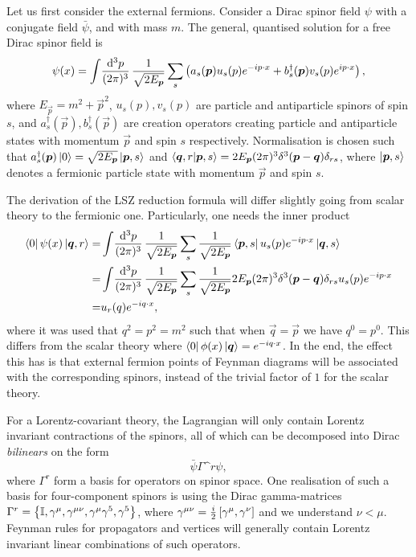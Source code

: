 \documentclass[../main.tex]{subfiles}
\begin{document}
Let us first consider the external fermions.
Consider a Dirac spinor field \(\psi\) with a conjugate field \(\bar\psi\), and with mass \(m\). The general, quantised solution for a free Dirac spinor field is~\cite{Peskin}
\begin{equation}
  \psi(x) = \loopintegral[3]{p} \frac{1}{\sqrt{2E_{\vec{p}}}} \sum_s \pclosed{a_s(\vec{p}) u_s(p) \exp{-i p\cdot x} + b_s^\dagger(\vec{p}) v_s(p) \exp{i p\cdot x}},
\end{equation}
where \(E_{\vec{p}} = m^2 + \vec{p}^2\), \(u_s(p), v_s(p)\) are particle and antiparticle spinors of spin \(s\), and \(a_s^\dagger(\vec{p}), b_s^\dagger(\vec{p})\) are creation operators creating particle and antiparticle states with momentum \(\vec{p}\) and spin \(s\) respectively.
Normalisation is chosen such that \(a_s^\dagger(\vec{p}) \ket{0} = \sqrt{2E_{\vec{p}}} \ket{\vec{p}, s}\) and \(\braket{\vec{q}, r}{\vec{p}, s} = 2E_{\vec{p}} (2\pi)^3 \delta^3(\vec{p}-\vec{q}) \delta_{rs}\), where \(\ket{\vec{p}, s}\) denotes a fermionic particle state with momentum \(\vec{p}\) and spin \(s\).

The derivation of the LSZ reduction formula will differ slightly going from scalar theory to the fermionic one.
Particularly, one needs the inner product
\begin{align}
  \nonumber
  \bra{0}\psi(x)\ket{\vec{q},r} = & \loopintegral[3]{p} \frac{1}{\sqrt{2E_{\vec{p}}}} \sum_s \frac{1}{\sqrt{2E_{\vec{p}}}} \bra{\vec{p}, s}  u_s(p) \exp{-i p\cdot x} \ket{\vec{q}, s}                          \\
  \nonumber
  =                               & \loopintegral[3]{p} \frac{1}{\sqrt{2E_{\vec{p}}}} \sum_s \frac{1}{\sqrt{2E_{\vec{p}}}} 2E_{\vec{p}} (2\pi)^3 \delta^3(\vec{p}-\vec{q}) \delta_{rs} u_s(p) \exp{-i p\cdot x} \\
  =                               & u_r(q) \exp{-i q\cdot x},
\end{align}
where it was used that \(q^2 = p^2 = m^2\) such that when \(\vec{q} = \vec{p}\) we have \(q^0 = p^0\).
This differs from the scalar theory where \(\bra{0} \phi(x) \ket{\vec{q}} = \exp{-i q\cdot x}\).
In the end, the effect this has is that external fermion points of Feynman diagrams will be associated with the corresponding spinors, instead of the trivial factor of \(1\) for the scalar theory.
\medskip

For a Lorentz-covariant theory, the Lagrangian will only contain Lorentz invariant contractions of the spinors, all of which can be decomposed into Dirac \emph{bilinears} on the form
\begin{equation}
  \bar\psi \Gamma\^r \psi,
\end{equation}
where \(\Gamma^r\) form a basis for operators on spinor space.
One realisation of such a basis for four-component spinors is using the Dirac gamma-matrices \(\Gamma\^r = \cclosed{\eye, \gamma\^\mu, \gamma\^{\mu\nu}, \gamma\^\mu \gamma\^5, \gamma\^5}\), where \(\gamma\^{\mu\nu} = \frac{i}{2} \bclosed{\gamma\^\mu, \gamma\^\nu}\) and we understand \(\nu < \mu\).
Feynman rules for propagators and vertices will generally contain Lorentz invariant linear combinations of such operators.
\end{document}
